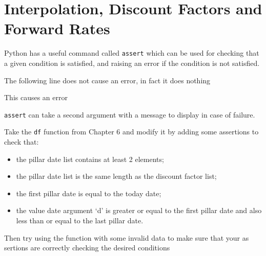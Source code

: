\chapter{Interpolation, Discount Factors and Forward Rates}\label{introduction-to-python---lesson-6}

\begin{Exercise}
Python has a useful command called \texttt{assert} which can be used for
checking that a given condition is satisfied, and raising an error if
the condition is not satisfied.

The following line does not cause an error, in fact it does nothing

\begin{Shaded}
\begin{Highlighting}[]
  \OperatorTok{<} 
\end{Highlighting}
\end{Shaded}

This causes an error

\begin{Shaded}
\begin{Highlighting}[]
  \OperatorTok{>} 
\end{Highlighting}
\end{Shaded}

\texttt{assert} can take a second argument with a message to display in case of failure.

\begin{Shaded}
\begin{Highlighting}[]
  \OperatorTok{>} \NormalTok{, }
\end{Highlighting}
\end{Shaded}

Take the \texttt{df} function from Chapter 6 and modify it by adding some assertions to check that:

\begin{itemize}
\tightlist
\item
  the pillar date list contains at least 2 elements;
\item
  the pillar date list is the same length as the discount factor list;
\item
  the first pillar date is equal to the today date;
\item
  the value date argument `d' is greater or equal to the first pillar
  date and also less than or equal to the last pillar date.
\end{itemize}

Then try using the function with some invalid data to make sure that your as sertions are correctly checking the desired conditions
\end{Exercise}

